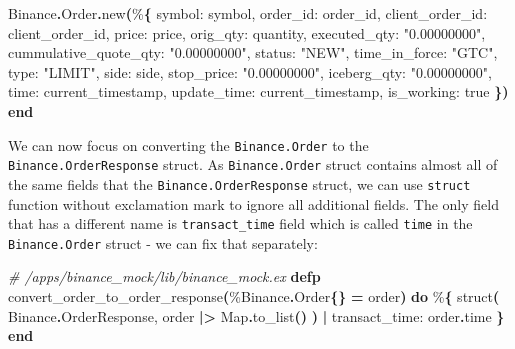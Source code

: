 \documentclass[
  oneside]{book}
\newenvironment{Shaded}{\begin{snugshade}}{\end{snugshade}}
\newcommand{\CommentTok}[1]{\textcolor[rgb]{0.56,0.35,0.01}{\textit{#1}}}
\newcommand{\ConstantTok}[1]{\textcolor[rgb]{0.56,0.35,0.01}{#1}}
\newcommand{\FunctionTok}[1]{\textcolor[rgb]{0.13,0.29,0.53}{\textbf{#1}}}
\newcommand{\KeywordTok}[1]{\textcolor[rgb]{0.13,0.29,0.53}{\textbf{#1}}}
\newcommand{\NormalTok}[1]{#1}
\newcommand{\OperatorTok}[1]{\textcolor[rgb]{0.81,0.36,0.00}{\textbf{#1}}}
\newcommand{\StringTok}[1]{\textcolor[rgb]{0.31,0.60,0.02}{#1}}
\newcommand{\VariableTok}[1]{\textcolor[rgb]{0.00,0.00,0.00}{#1}}
\begin{document}
\begin{Shaded}
\begin{Highlighting}[]
    \ConstantTok{Binance}\OperatorTok{.}\ConstantTok{Order}\OperatorTok{.}\NormalTok{new}\FunctionTok{(}\NormalTok{\%}\FunctionTok{\{}
      \VariableTok{symbol:}\NormalTok{ symbol,}
      \VariableTok{order\_id:}\NormalTok{ order\_id,}
      \VariableTok{client\_order\_id:}\NormalTok{ client\_order\_id,}
      \VariableTok{price:}\NormalTok{ price,}
      \VariableTok{orig\_qty:}\NormalTok{ quantity,}
      \VariableTok{executed\_qty:} \StringTok{"0.00000000"}\NormalTok{,}
      \VariableTok{cummulative\_quote\_qty:} \StringTok{"0.00000000"}\NormalTok{,}
      \VariableTok{status:} \StringTok{"NEW"}\NormalTok{,}
      \VariableTok{time\_in\_force:} \StringTok{"GTC"}\NormalTok{,}
      \VariableTok{type:} \StringTok{"LIMIT"}\NormalTok{,}
      \VariableTok{side:}\NormalTok{ side,}
      \VariableTok{stop\_price:} \StringTok{"0.00000000"}\NormalTok{,}
      \VariableTok{iceberg\_qty:} \StringTok{"0.00000000"}\NormalTok{,}
      \VariableTok{time:}\NormalTok{ current\_timestamp,}
      \VariableTok{update\_time:}\NormalTok{ current\_timestamp,}
      \VariableTok{is\_working:} \ConstantTok{true}
    \FunctionTok{\})}
  \KeywordTok{end}
\end{Highlighting}
\end{Shaded}

\newpage

We can now focus on converting the \texttt{Binance.Order} to the \texttt{Binance.OrderResponse} struct. As \texttt{Binance.Order} struct contains almost all of the same fields that the \texttt{Binance.OrderResponse} struct, we can use \texttt{struct} function without exclamation mark to ignore all additional fields. The only field that has a different name is \texttt{transact\_time} field which is called \texttt{time} in the \texttt{Binance.Order} struct - we can fix that separately:

\begin{Shaded}
\begin{Highlighting}[]
\CommentTok{\# /apps/binance\_mock/lib/binance\_mock.ex}
  \KeywordTok{defp}\NormalTok{ convert\_order\_to\_order\_response}\FunctionTok{(}\NormalTok{\%}\ConstantTok{Binance}\OperatorTok{.}\ConstantTok{Order}\FunctionTok{\{\}} \OperatorTok{=}\NormalTok{ order}\FunctionTok{)} \KeywordTok{do}
\NormalTok{    \%}\FunctionTok{\{}
\NormalTok{      struct}\FunctionTok{(}
        \ConstantTok{Binance}\OperatorTok{.}\ConstantTok{OrderResponse}\NormalTok{,}
\NormalTok{        order }\OperatorTok{|\textgreater{}} \ConstantTok{Map}\OperatorTok{.}\NormalTok{to\_list}\FunctionTok{()}
      \FunctionTok{)}
      \OperatorTok{|} \VariableTok{transact\_time:}\NormalTok{ order}\OperatorTok{.}\NormalTok{time}
    \FunctionTok{\}}
  \KeywordTok{end}
\end{Highlighting}
\end{Shaded}
\end{document}

